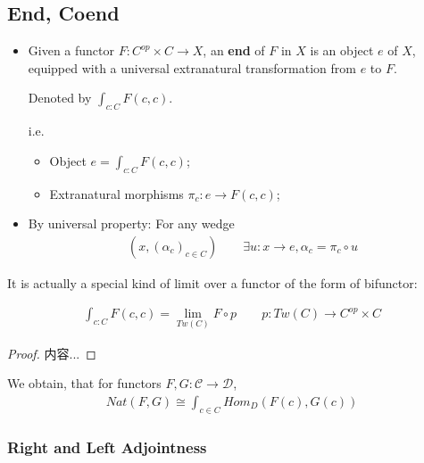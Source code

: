 \documentclass[Total.tex]{subfiles}
\begin{document}
			\subsection{End, Coend}
				\begin{Def}
					\begin{itemize}
						\item 
						Given a functor $F:C^{op}\times C\rightarrow X$, an \textbf{end} of $F$ in $X$ is an object $e$ of $X$, equipped with a universal extranatural transformation from $e$ to $F$. 
						
						Denoted by $\int_{c:C} F(c,c)$.
						
						i.e.
						\begin{itemize}
							\item Object $e=\int_{c:C} F(c,c)$;
							\item Extranatural morphisms $\pi_c:e\rightarrow F(c,c)$;
						\end{itemize}
						\item By universal property: For any wedge
						\begin{gather*}
							(x,(\alpha_c)_{c\in C})\qquad \exists u:x\rightarrow e, \alpha_c=\pi_c\circ u
						\end{gather*}
					\end{itemize}
				\end{Def}
				
				It is actually a special kind of limit over a functor of the form of bifunctor:
				\begin{proposition}
					\begin{gather*}
						\int_{c:C} F(c,c)=\lim_{Tw(C)} F\circ p\qquad p:Tw(C)\rightarrow C^{op}\times C
					\end{gather*}
				\end{proposition}
				\begin{proof}
					内容...
				\end{proof}
				
				\begin{example}
					We obtain, that for functors $F,G:\mathcal{C}\rightarrow \mathcal{D}$, 
					\begin{gather*}
						Nat(F,G)\cong \int_{c\in C} Hom_D(F(c),G(c))
					\end{gather*}
				\end{example}
				\subsubsection{Right and Left Adjointness}
\end{document}

